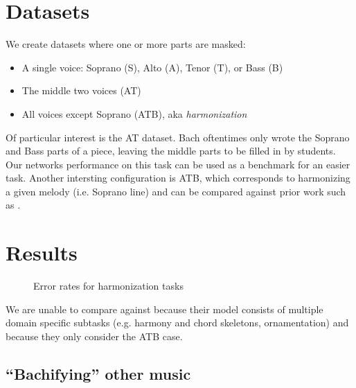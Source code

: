 \section{Datasets}

We create datasets where one or more parts are masked:
\begin{itemize}
  \item A single voice: Soprano (S), Alto (A), Tenor (T), or Bass (B)
  \item The middle two voices (AT)
  \item All voices except Soprano (ATB), aka \emph{harmonization}
\end{itemize}


Of particular interest is the AT dataset. Bach oftentimes only wrote the
Soprano and Bass parts of a piece, leaving the middle parts to be filled in by
students. Our networks performance on this task can be used as a benchmark for
an easier task. Another intersting configuration is ATB, which corresponds to
harmonizing a given melody (i.e. Soprano line) and can be compared against
prior work such as \citet{Allan2005}.

\section{Results}
\label{sec:harmonization-results}


\begin{figure}[tb]
  \centering
  
  \caption{Error rates for harmonization tasks}
  \label{fig:harmonization-results}
\end{figure}

We are unable to compare against \citet{Allan2005} because their model consists
of multiple domain specific subtasks (e.g. harmony and chord skeletons,
ornamentation) and because they only consider the ATB case.

\subsection{``Bachifying'' other music}

